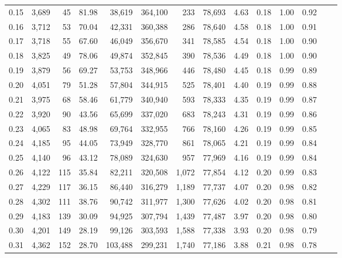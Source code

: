 \begin{tabular}{rrrrrrrrrrrrrr}
0.15 &  3,689 &     45 &    81.98 &   38,619 &  364,100 &     233 &  78,693 &  4.63 &  0.18 &  1.00 &      0.92 \\
0.16 &  3,712 &     53 &    70.04 &   42,331 &  360,388 &     286 &  78,640 &  4.58 &  0.18 &  1.00 &      0.91 \\
0.17 &  3,718 &     55 &    67.60 &   46,049 &  356,670 &     341 &  78,585 &  4.54 &  0.18 &  1.00 &      0.90 \\
0.18 &  3,825 &     49 &    78.06 &   49,874 &  352,845 &     390 &  78,536 &  4.49 &  0.18 &  1.00 &      0.90 \\
0.19 &  3,879 &     56 &    69.27 &   53,753 &  348,966 &     446 &  78,480 &  4.45 &  0.18 &  0.99 &      0.89 \\
0.20 &  4,051 &     79 &    51.28 &   57,804 &  344,915 &     525 &  78,401 &  4.40 &  0.19 &  0.99 &      0.88 \\
0.21 &  3,975 &     68 &    58.46 &   61,779 &  340,940 &     593 &  78,333 &  4.35 &  0.19 &  0.99 &      0.87 \\
0.22 &  3,920 &     90 &    43.56 &   65,699 &  337,020 &     683 &  78,243 &  4.31 &  0.19 &  0.99 &      0.86 \\
0.23 &  4,065 &     83 &    48.98 &   69,764 &  332,955 &     766 &  78,160 &  4.26 &  0.19 &  0.99 &      0.85 \\
0.24 &  4,185 &     95 &    44.05 &   73,949 &  328,770 &     861 &  78,065 &  4.21 &  0.19 &  0.99 &      0.84 \\
0.25 &  4,140 &     96 &    43.12 &   78,089 &  324,630 &     957 &  77,969 &  4.16 &  0.19 &  0.99 &      0.84 \\
0.26 &  4,122 &    115 &    35.84 &   82,211 &  320,508 &   1,072 &  77,854 &  4.12 &  0.20 &  0.99 &      0.83 \\
0.27 &  4,229 &    117 &    36.15 &   86,440 &  316,279 &   1,189 &  77,737 &  4.07 &  0.20 &  0.98 &      0.82 \\
0.28 &  4,302 &    111 &    38.76 &   90,742 &  311,977 &   1,300 &  77,626 &  4.02 &  0.20 &  0.98 &      0.81 \\
0.29 &  4,183 &    139 &    30.09 &   94,925 &  307,794 &   1,439 &  77,487 &  3.97 &  0.20 &  0.98 &      0.80 \\
0.30 &  4,201 &    149 &    28.19 &   99,126 &  303,593 &   1,588 &  77,338 &  3.93 &  0.20 &  0.98 &      0.79 \\
0.31 &  4,362 &    152 &    28.70 &  103,488 &  299,231 &   1,740 &  77,186 &  3.88 &  0.21 &  0.98 &      0.78 \\

\end{tabular}
